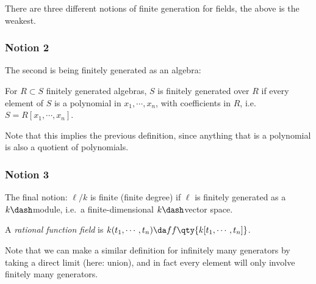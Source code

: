 There are three different notions of finite generation for fields, the
above is the weakest.

\hypertarget{notion-2}{%
\subsubsection{Notion 2}\label{notion-2}}

The second is being finitely generated as an algebra:

\begin{definition}

For \(R\subset S\) finitely generated algebras, \(S\) is finitely
generated over \(R\) if every element of \(S\) is a polynomial in
\(x_1, \cdots, x_n\), with coefficients in \(R\),
i.e.~\(S = R[x_1, \cdots, x_n]\).

\end{definition}

Note that this implies the previous definition, since anything that is a
polynomial is also a quotient of polynomials.

\hypertarget{notion-3}{%
\subsubsection{Notion 3}\label{notion-3}}

The final notion: \(\ell/k\) is finite (finite degree) if \(\ell\) is
finitely generated as a \(k\dash\)module, i.e.~a finite-dimensional
\(k\dash\)vector space.

\begin{definition}

A \emph{rational function field} is
\(k(t_1, \cdots, t_n) \da ff \qty{ k[t_1, \cdots, t_n]}\).

\end{definition}

Note that we can make a similar definition for infinitely many
generators by taking a direct limit (here: union), and in fact every
element will only involve finitely many generators.

